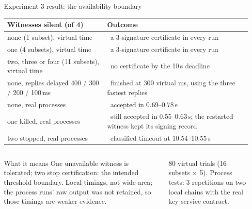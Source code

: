 \documentclass[aspectratio=169,10pt]{beamer}
\newcommand{\cmark}{\textcolor{okgreen}{\ding{51}}}
\newcommand{\xmark}{\textcolor{badred!80}{\ding{55}}}
\begin{document}
\begin{frame}{Experiment 3 result: the availability boundary}
\vspace{0.3em}
\scriptsize
\renewcommand{\arraystretch}{1.1}
\begin{tabular}{@{}L{0.42\textwidth} L{0.55\textwidth}@{}}
\toprule
\textbf{Witnesses silent (of 4)} & \textbf{Outcome} \\
\midrule
none (1 subset), virtual time & \cmark\ a 3-signature certificate in every run \\
one (4 subsets), virtual time & \cmark\ a 3-signature certificate in every run \\
two, three or four (11 subsets), virtual time & \xmark\ no certificate by the 10\,s deadline \\
none, replies delayed 400 / 300 / 200 / 100\,ms & \cmark\ finished at 300 virtual ms, using the three fastest replies \\
none, real processes & \cmark\ accepted in 0.69--0.78\,s \\
one killed, real processes & \cmark\ still accepted in 0.55--0.63\,s; the restarted witness kept its signing record \\
two stopped, real processes & \xmark\ classified timeout at 10.54--10.55\,s \\
\bottomrule
\end{tabular}

\vspace{0.5em}
\begin{columns}[T,onlytextwidth]
\begin{alertblock}{What it means}
\scriptsize One unavailable witness is tolerated; two stop certification: the intended threshold boundary. Local timings, not wide-area; the process runs' raw output was not retained, so those timings are weaker evidence.
\end{alertblock}
\scriptsize\color{datagray}
80 virtual trials (16 subsets $\times$ 5). Process tests: 3 repetitions on two local chains with the real key-service contract.\\[3pt]
\end{columns}
\end{frame}
\end{document}
